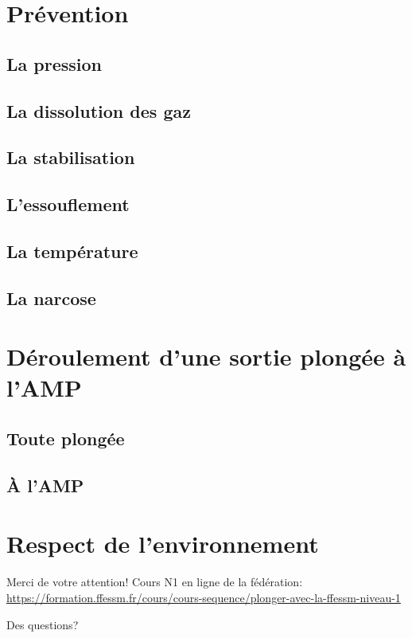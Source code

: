 \documentclass{beamer}
\begin{document}
\section{Prévention}
\subsection{La pression}


\subsection{La dissolution des gaz}


\subsection{La stabilisation}


\subsection{L'essouflement}


\subsection{La température}


\subsection{La narcose}


\section{Déroulement d'une sortie plongée à l'AMP}
\subsection{Toute plongée}

\subsection{À l'AMP}


\section{Respect de l'environnement}


\begin{frame}{Merci de votre attention!}
\color{white}
Cours N1 en ligne de la fédération:\\\url{https://formation.ffessm.fr/cours/cours-sequence/plonger-avec-la-ffessm-niveau-1}
\begin{center}
\Huge Des questions?
\end{center}
\end{frame}
\end{document}
